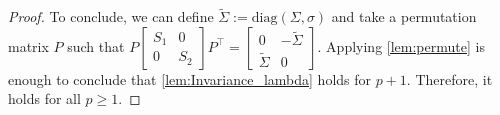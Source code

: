 \documentclass[10pt,a4paper]{amsart}
\begin{document}
\begin{proof}
			To conclude, we can define $\widetilde{\Sigma}:=\mathrm{diag}(\Sigma,\sigma)$ and take a permutation matrix $P$ such that $P\left[\begin{smallmatrix}
			S_1&0\\
			0&S_2
			\end{smallmatrix}\right]P^\top =\left[\begin{smallmatrix}
			0&-\widetilde{\Sigma}\\
			\widetilde{\Sigma}&0
			\end{smallmatrix}\right]$. Applying \cref{lem:permute} is enough to conclude that \cref{lem:Invariance_lambda} holds for $p+1$. Therefore, it holds for all $p\geq 1$.
	\end{proof}
\end{document}
